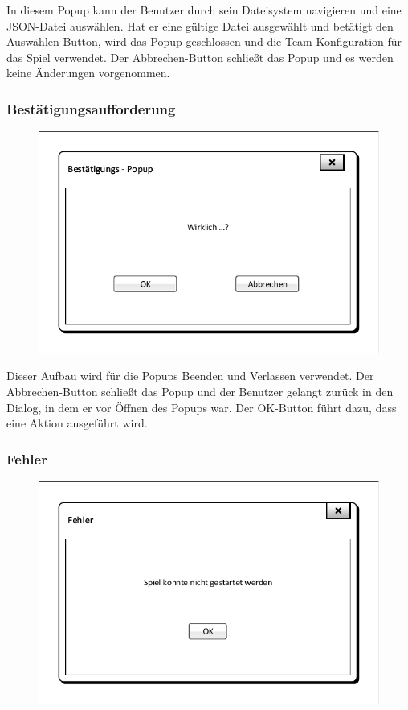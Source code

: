 In diesem Popup kann der Benutzer durch sein Dateisystem navigieren und eine JSON-Datei auswählen. Hat er eine gültige Datei ausgewählt und betätigt den \glqq{}Auswählen\grqq{}-Button, wird das Popup geschlossen und die Team-Konfiguration für das Spiel verwendet. Der \glqq{}Abbrechen\grqq{}-Button schließt das Popup und es werden keine Änderungen vorgenommen.

\subsubsection{Bestätigungsaufforderung}
\begin{figure}[H]
    \centering
    \includegraphics[scale=0.8]{../Meilenstein03/images/OK_Popup.pdf}
\end{figure}

Dieser Aufbau wird für die Popups \glqq{}Beenden\grqq{} und \glqq{}Verlassen\grqq{} verwendet. Der \glqq{}Abbrechen\grqq{}-Button schließt das Popup und der Benutzer gelangt zurück in den Dialog, in dem er vor Öffnen des Popups war. Der \glqq{}OK\grqq{}-Button führt dazu, dass eine Aktion ausgeführt wird.

\subsubsection{Fehler}
\begin{figure}[H]
    \centering
    \includegraphics[scale=0.8]{../Meilenstein03/images/Fehler_Popup.pdf}
\end{figure}

